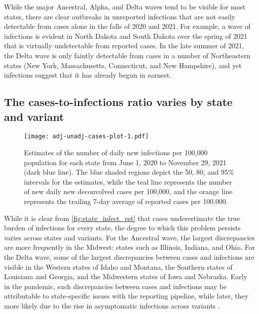 While the major Ancestral, Alpha, and Delta waves tend to be visible for most
states, there are clear outbreaks in unreported infections that are not easily
detectable from cases alone in the falls of 2020 and 2021. For example, a wave 
of infections is evident in North Dakota and South Dakota over the spring of 2021
that is virtually undetectable from reported cases. In the late summer of 2021, the
Delta wave is only faintly detectable from cases in a number of Northeastern
states (New York, Massachusetts, Connecticut, and New Hampshire), and yet
infections suggest that it has already begun in earnest. 

\subsection{The cases-to-infections ratio varies by state and variant}
\label{sec:case-infection-ratio}

\begin{figure}[!tb]
\centering
\texttt{[image: adj-unadj-cases-plot-1.pdf]} 
\caption{Estimates of the number of daily new infections per 100,000
population for each \US state from June 1, 2020 to November 29, 2021
(dark blue line). The blue shaded regions depict the 50, 80, and 95\%
intervals for the estimates, while the teal line represents
the number of new daily new deconvolved cases per 100,000, and the
orange line represents the trailing 7-day average of reported cases per
100,000.}
\label{fig:state_infect_est}
\end{figure}    

While it is clear from \autoref{fig:state_infect_est} that cases underestimate
the true burden of infections for every state, the degree to which this problem
persists varies across states and variants. 
For the Ancestral wave, the largest
discrepancies are more frequently in the Midwest: states such as Illinois,
Indiana, and Ohio. 
For the Delta wave, some of the
largest discrepancies between cases and infections are visible in the Western
states of Idaho and Montana, the Southern states of Louisiana and Georgia, and
the Midwestern states of Iowa and Nebraska. 
Early in the pandemic, such discrepancies between cases and
infections may be attributable to state-specific issues with the reporting
pipeline, while later, they more likely due to the rise in asymptomatic
infections across variants \citep{oph2022covid, garrett2022high}. 

